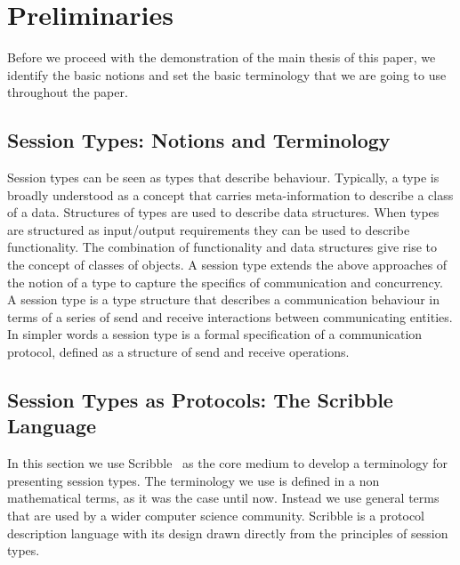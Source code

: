 \section{Preliminaries}
\label{sec:preliminaries}

Before we proceed with the demonstration of the main thesis
of this paper, we identify the basic notions and set the basic
terminology that we are going to use throughout the paper.

\subsection{Session Types: Notions and Terminology}

Session types can be seen as types that describe behaviour.
Typically, a type is broadly understood
as a concept that carries meta-information to describe a class of a data.
Structures of types are used to describe data structures.
When types are structured as input/output requirements they
can be used to describe functionality. The combination of
functionality and data structures give rise to the concept
of classes of objects.
%
A session type extends the above approaches of
the notion of a type to capture the specifics of communication and concurrency.
A session type is a type structure that describes a communication
behaviour in terms of a series of send and receive interactions between
communicating entities.
In simpler words a session type is a formal specification of a
communication protocol, defined as a structure of send and receive
operations.



\subsection{Session Types as Protocols: The Scribble Language}

In this section we use Scribble~\cite{scribble} as the core
medium to develop a terminology for presenting session types.
The terminology we use is defined in a non mathematical terms,
as it was the case until now. Instead we use general terms
that are used by a wider computer science community.
Scribble is a protocol description language with its design
drawn directly from the principles of session types.

